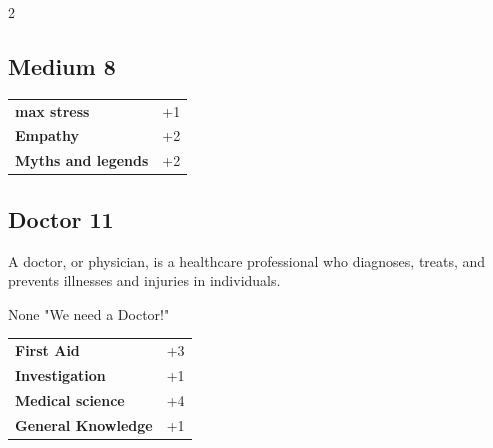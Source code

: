 \begin{multicols}{2}
\begin{tcolorbox}

\end{tcolorbox}

\begin{tcolorbox}
    \subsection*{Medium \hfill \small{8 }}
    \tcblower




\begin{tabular}{@{}ll@{}}
    \textbf{max stress} & +1\\
    \textbf{Empathy} & +2\\
    \textbf{Myths and legends} & +2\\
\end{tabular}


\end{tcolorbox}

\begin{tcolorbox}
    \subsection*{Doctor \hfill \small{11 }}
    \tcblower
A doctor, or physician, is a healthcare professional who diagnoses, treats, and prevents illnesses and injuries in individuals.

\begin{pquote}{None}
"We need a Doctor!"
\end{pquote}

\vspace{3mm}

\begin{tabular}{@{}ll@{}}
    \textbf{First Aid} & +3\\
    \textbf{Investigation} & +1\\
    \textbf{Medical science} & +4\\
    \textbf{General Knowledge} & +1\\
\end{tabular}



\end{tcolorbox}
\end{multicols}
